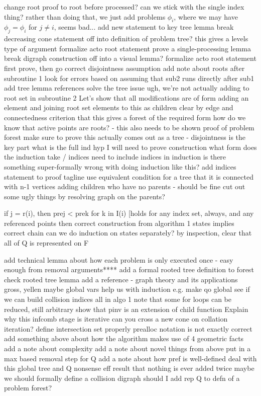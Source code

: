 \documentclass[11pt,reqno]{amsart}
\theoremstyle{definition}
\numberwithin{equation}{section}
\newcommand{\pre}{\phi}
\begin{document}
\begin{enumerate}
change root proof to root before processed? 
can we stick with the single index thing? 
rather than doing that, we just add problems $\pre_i$, where we may have $\pre_j = \pre_i$ for $j \not = i$, seems bad...
add new statement to key tree lemma
break decreasing cone statement off into definition of problem tree? 
this gives a levels type of argument 
formalize acto root statement
prove a single-processing lemma 
break digraph construction off into a visual lemma? 
formalize acto root statement 
first prove, then go correct disjointness assumption
add note about roots after subroutine 1 
look for errors based on assuming that sub2 runs directly after sub1
add tree lemma references
solve the tree issue
ugh, we're not actually adding to root set in subroutine 2 
Let's show that all modifications are of form
    adding an element and joining root set elements to this as children 
    clear by edge and connectedness criterion that this gives a forest of the required form 
how do we know that active points are roots? - this also needs to be shown
proof of problem forest
make sure to prove this actually comes out as a tree - disjointness is the key part
what is the full ind hyp I will need to prove construction 
what form does the induction take / indices
need to include indices in induction
is there something super-formally wrong with doing induction like this? 
add indices statement to proof tagline
use equivalent condition for a tree that it is connected with n-1 vertices
adding children who have no parents - should be fine 
cut out some ugly things by resolving graph on the parents? 

if j = r(i), then prej <  prek for k in I(i) [holds for any index set, always, and any referenced points 
then correct construction from algorithm 1 states implies correct chain 
can we do induction on states separately? 
by inspection, clear that all of Q is represented on F

add technical lemma about how each problem is only executed once - easy enough from removal arguments****
add a formal rooted tree definition to forest 
check rooted tree lemma 
add a reference - graph theory and its applications gross, yellen
maybe global vars help us with induction e.g. make qo global 
see if we can build collision indices all in algo 1 
note that some for loops can be reduced, still arbitrary
show that pinv is an extension of child function 
Explain why this infcomb stage is iterative 
can you cross a new cone on collation iteration? 
define intersection set properly
prealloc notation is not exactly correct
add something above about how the algorithm makes use of 4 geometric facts 
add a note about complexity 
add a note about novel things from above
put in a max based removal step for Q
add a note about how pref is well-defined 
deal with this global tree and Q nonsense
eff result that nothing is ever added twice
maybe we should formally define a collision digraph 
should I add rep Q to defn of a problem forest? 


\end{enumerate}
\end{document}
